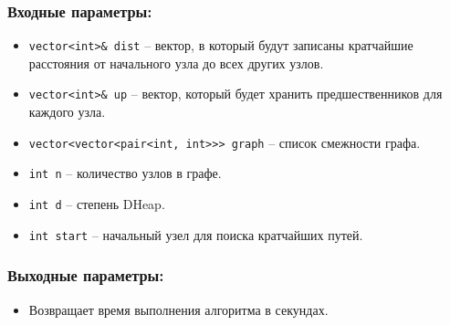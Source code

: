 \subsubsection*{Входные параметры:}
\begin{itemize}
    \item \texttt{vector<int>\& dist} -- вектор, в который будут записаны кратчайшие расстояния от начального узла до всех других узлов.
    \item \texttt{vector<int>\& up} -- вектор, который будет хранить предшественников для каждого узла.
    \item \texttt{vector<vector<pair<int, int>>> graph} -- список смежности графа.
    \item \texttt{int n} -- количество узлов в графе.
    \item \texttt{int d} -- степень DHeap.
    \item \texttt{int start} -- начальный узел для поиска кратчайших путей.
\end{itemize}


\subsubsection*{Выходные параметры:}
\begin{itemize}
    \item Возвращает время выполнения алгоритма в секундах.
\end{itemize}
